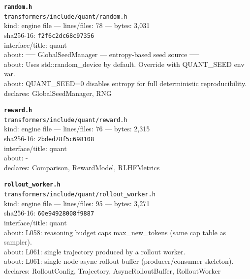\noindent\textbf{\texttt{random.h}}\\
\texttt{transformers/include/quant/random.h}\\
kind: engine file --- lines/files: 78 --- bytes: 3,031\\
sha256-16: \texttt{f2f6c2dc68c97356}\\
interface/title: quant\\
about: ── GlobalSeedManager — entropy-based seed source ──\\
about: Uses std::random\_device by default. Override with QUANT\_SEED env var.\\
about: QUANT\_SEED=0 disables entropy for full deterministic reproducibility.\\
declares: GlobalSeedManager, RNG\\
\vspace*{6.0pt}
\newpage

\noindent\textbf{\texttt{reward.h}}\\
\texttt{transformers/include/quant/reward.h}\\
kind: engine file --- lines/files: 76 --- bytes: 2,315\\
sha256-16: \texttt{2bded78f5c698108}\\
interface/title: quant\\
about: -\\
declares: Comparison, RewardModel, RLHFMetrics\\
\vspace*{6.0pt}

\noindent\textbf{\texttt{rollout\_worker.h}}\\
\texttt{transformers/include/quant/rollout\_worker.h}\\
kind: engine file --- lines/files: 95 --- bytes: 3,271\\
sha256-16: \texttt{60e94928008f9887}\\
interface/title: quant\\
about: L058: reasoning budget caps max\_new\_tokens (same cap table as sampler).\\
about: L061: single trajectory produced by a rollout worker.\\
about: L061: single-node async rollout buffer (producer/consumer skeleton).\\
declares: RolloutConfig, Trajectory, AsyncRolloutBuffer, RolloutWorker\\
\vspace*{6.0pt}

